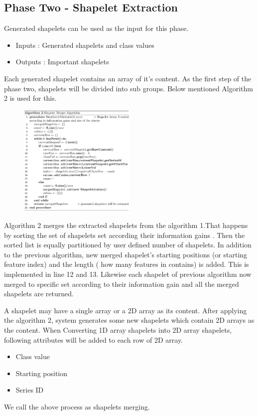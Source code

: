 \documentclass[conference]{IEEEtran}  %
\begin{document}
\subsection{Phase Two - Shapelet Extraction}
Generated shapelets can be used as the input for this phase.
\begin{itemize}
\item Inputs : Generated shapelets and class values
\item Outputs : Important shapelets
\end{itemize}
Each generated shapelet contains an array of it’s content. As the first step of the phase two, shapelets will be divided into sub groups. Below mentioned Algorithm 2 is used for this.

\begin{figure}[h!]
\includegraphics[width=0.5\textwidth]{algo2.png}
\end{figure}

Algorithm 2 merges the extracted shapelets from the algorithm 1.That happens by sorting the set of shapelets set according their information gains . Then the sorted list is equally partitioned by user defined number of shapelets. In addition to the previous algorithm, new merged shapelet’s starting positions (or starting feature index) and the length ( how many features in contains) is added. This is implemented in line 12 and 13. Likewise each shapelet of previous algorithm now merged to specific set according to their information gain and all the merged shapelets are returned.

A shapelet may have a single array or a 2D array as its content. After applying the algorithm 2, system generates some new shapelets which contain 2D arrays as the content. When Converting 1D array shapelets into 2D array shapelets, following attributes will be added to each row of 2D array.
\begin{itemize}
\item Class value
\item Starting position
\item Series ID
\end{itemize}
We call the above process as shapelets merging.
\end{document}
